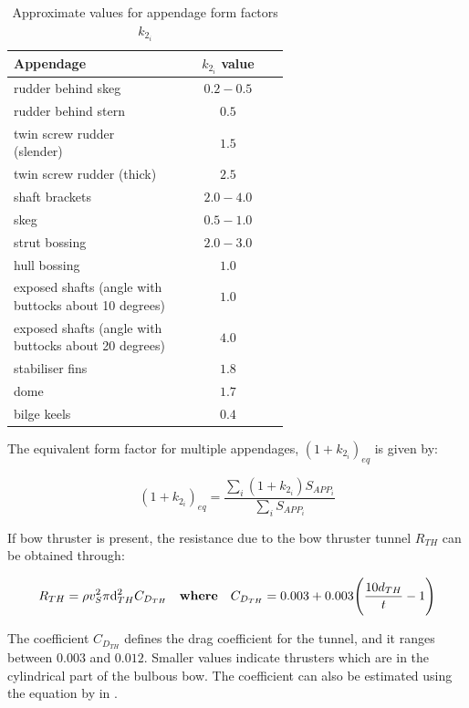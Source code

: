 \begin{table}[ht]
    \footnotesize
    \centering
    {\begin{tabular}{ p{0.6\linewidth} c}
    \hline
    Appendage & $k_{2_i}$ value \\
    \hline
    rudder behind skeg & $0.2-0.5$ \\
    rudder behind stern & $0.5$ \\
    twin screw rudder (slender) & $1.5$ \\
    twin screw rudder (thick) & $2.5$ \\
    shaft brackets & $2.0-4.0$ \\
    skeg & $0.5-1.0$ \\
    strut bossing & $2.0-3.0$ \\
    hull bossing & $1.0$ \\
    exposed shafts (angle with buttocks about 10 degrees) & $1.0$ \\
    exposed shafts (angle with buttocks about 20 degrees) & $4.0$ \\
    stabiliser fins & $1.8$ \\
    dome & $1.7$ \\
    bilge keels & $0.4$ \\ 
    \hline
    \end{tabular}}
\caption{Approximate values for appendage form factors $k_{2_i}$}\label{tbl:k2i_values}
\end{table}

The equivalent form factor for multiple appendages, $(1+k_{2_i})_{eq}$ is given by:

\begin{equation}\label{eqn:k2eq}
    (1+k_{2_i})_{eq} = \frac{\sum_i(1+k_{2_i})S_{APP_i}}{\sum_iS_{APP_i}}
\end{equation}

If bow thruster is present, the resistance due to the bow thruster tunnel $R_{TH}$ can be obtained through:

\begin{equation}\label{eqn:R_th}
    R_{TH} = \rho v_S^2 \pi \d_{TH}^2 C_{D_{TH}} \quad \textbf{where} \quad C_{D_{TH}} = 0.003 + 0.003 \Biggl( \frac{10{d_{TH}}}{t} - 1 \Biggr) 
\end{equation}

The coefficient $C_{D_{TH}}$ defines the drag coefficient for the tunnel, and it ranges between $0.003$ and $0.012$. Smaller values indicate thrusters which are in the cylindrical part of the bulbous bow. The coefficient can also be estimated using the equation by  in .\\

